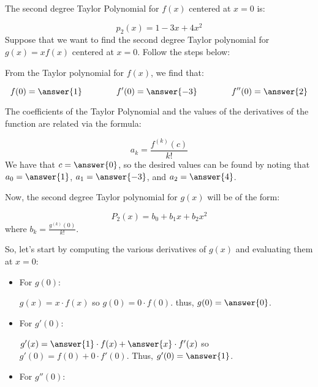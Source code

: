 \documentclass{ximera}
\author{Jim Talamo}
\begin{document}
\begin{exercise}
The second degree Taylor Polynomial for $f(x)$ centered at $x=0$ is:

\[
p_2(x) =1-3x+4x^2
\]
Suppose that we want to find the second degree Taylor polynomial for $g(x) = xf(x)$ centered at $x=0$.  Follow the steps below:

From the Taylor polynomial for $f(x)$, we find that:

\[
f(0) = \answer{1} \qquad \qquad f'(0) = \answer{-3} \qquad \qquad f''(0) = \answer{2}
\]

\begin{hint}

The coefficients of the Taylor Polynomial and the values of the derivatives of the function are related via the formula:

\[
a_k = \frac{f^{(k)}(c)}{k!}
\]
We have that $c=\answer{0}$, so the desired values can be found by noting that $a_0 = \answer{1}$, $a_1 = \answer{-3}$, and $a_2 = \answer{4}$.   

\end{hint}

\begin{exercise}
Now, the second degree Taylor polynomial for $g(x)$ will be of the form:

\[
P_2(x) = b_0+b_1x+b_2x^2
\]
where $b_k = \frac{g^{(k)}(0)}{k!}$.

So, let's start by computing the various derivatives of $g(x)$ and evaluating them at $x=0$:

\begin{question}
\begin{itemize}
\item  For $g(0)$:

$g(x) = x \cdot f(x)$ so $g(0) = 0 \cdot f(0)$.  thus, $g(0) = \answer{0}$.
\end{itemize}
\end{question}

\begin{question}
\begin{itemize}
\item  For $g'(0)$:

$g'(x) = \answer{1} \cdot f(x)+\answer{x} \cdot f'(x)$ so $g'(0) = f(0)+0 \cdot f'(0)$.  Thus, $g'(0) = \answer{1}$.
\end{itemize}
\end{question}

\begin{question}
\begin{itemize}
\item  For $g''(0)$:


\end{itemize}
\end{question}
\end{exercise}
\end{exercise}
\end{document}

